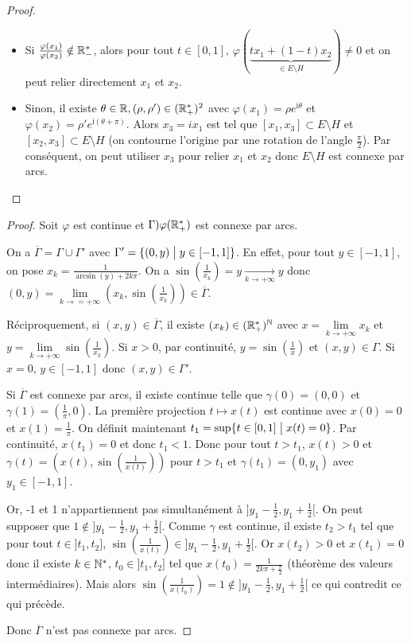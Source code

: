 \begin{proof}
\begin{enumerate}
		\begin{itemize}
			\item Si $\frac{\varphi(x_{1})}{\varphi(x_{2})}\notin\mathbb{R}_{-}^{*}$, alors pour tout $t\in[0,1]$, $\varphi(\underbrace{tx_{1}+(1-t)x_{2}}_{\in E\setminus H})\neq0$ et on peut relier directement $x_{1}$ et $x_{2}$.
			\item Sinon, il existe $\theta\in\mathbb{R},(\rho,\rho')\in(\mathbb{R}_{+}^{*})^{2}$ avec $\varphi(x_{1})=\rho e^{\mathrm{i}\theta}$ et $\varphi(x_{2})=\rho'e^{\mathrm{i}(\theta+\pi)}$. Alors $x_{3}=ix_{1}$ est tel que $[x_{1},x_{3}]\subset E\setminus H$ et $[x_{2},x_{3}]\subset E\setminus H$ (on contourne l'origine par une rotation de l'angle $\frac{\pi}{2}$). Par conséquent, on peut utiliser $x_{3}$ pour relier $x_{1}$ et $x_{2}$ donc $E\setminus H$ est connexe par arcs.
		\end{itemize}
	\end{enumerate}
\end{proof}

\begin{proof}
	Soit 
	$\varphi$ est continue et $\Gamma)\varphi(\mathbb{R}_{+}^{*})$ est connexe par arcs.

	On a $\overline{\Gamma}=\Gamma\cup\Gamma'$ avec $\Gamma'=\{(0,y)\bigm| y\in[-1,1]\}$. En effet, pour tout $y\in[-1,1]$, on pose $x_{k}=\frac{1}{\arcsin(y)+2k\pi}$. On a $\sin(\frac{1}{x_{k}})=y\xrightarrow[k\to+\infty]{}y$ donc $(0,y)=\lim\limits_{k\to=+\infty}(x_{k},\sin(\frac{1}{x_{k}}))\in\overline{\Gamma}$.

	Réciproquement, si $(x,y)\in\overline{\Gamma}$, il existe $(x_{k})\in(\mathbb{R}_{+}^{*})^{\mathbb{N}}$ avec $x=\lim\limits_{k\to+\infty}x_{k}$ et $y=\lim\limits_{k\to+\infty}\sin(\frac{1}{x_{k}})$. Si $x>0$, par continuité, $y=\sin(\frac{1}{x})$ et $(x,y)\in\Gamma$. Si $x=0$, $y\in[-1,1]$ donc $(x,y)\in\Gamma'$.

	Si $\overline{\Gamma}$ est connexe par arcs, il existe 
	continue telle que $\gamma(0)=(0,0)$ et $\gamma(1)=(\frac{1}{\pi},0)$. La première projection $t\mapsto x(t)$ est continue avec $x(0)=0$ et $x(1)=\frac{1}{\pi}$. On définit maintenant $t_{1}=\sup\{t\in[0,1]\bigm| x(t)=0\}$. Par continuité, $x(t_{1})=0$ et donc $t_{1}<1$. Donc pour tout $t>t_{1}$, $x(t)>0$ et $\gamma(t)=(x(t),\sin(\frac{1}{x(t)}))$ pour $t>t_{1}$ et $\gamma(t_{1})=(0,y_{1})$ avec $y_{1}\in[-1,1]$.

	Or, -1 et 1 n'appartiennent pas simultanément à $]y_{1}-\frac{1}{2},y_{1}+\frac{1}{2}[$. On peut supposer que $1\notin]y_{1}-\frac{1}{2},y_{1}+\frac{1}{2}[$. Comme $\gamma$ est continue, il existe $t_{2}>t_{1}$ tel que pour tout $t\in]t_{1},t_{2}]$, $\sin(\frac{1}{x(t)})\in]y_{1}-\frac{1}{2},y_{1}+\frac{1}{2}[$. Or $x(t_{2})>0$ et $x(t_{1})=0$ donc il existe $k\in\mathbb{N}^{*}$, $t_{0}\in]t_{1},t_{2}]$ tel que $x(t_{0})=\frac{1}{2k\pi+\frac{\pi}{2}}$ (théorème des valeurs intermédiaires). Mais alors $\sin(\frac{1}{x(t_{0})})=1\notin]y_{1}-\frac{1}{2},y_{1}+\frac{1}{2}[$ ce qui contredit ce qui précède.

	Donc $\overline{\Gamma}$ n'est pas connexe par arcs.
\end{proof}

